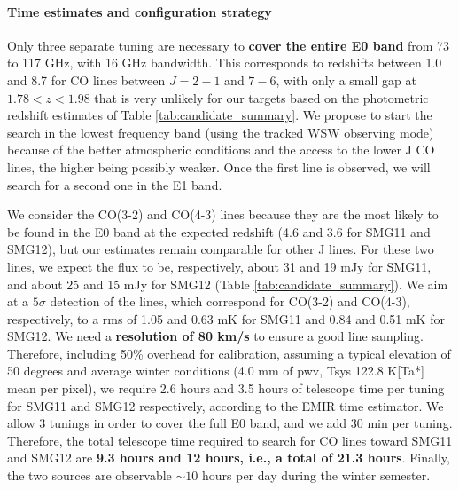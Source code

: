 \documentclass[11pt,a4paper,twoside,graphicx,color]{article}
\begin{document}
\paragraph{\large Time estimates and configuration strategy}
Only three separate tuning are necessary to {\bf cover the entire E0 band} from 73 to 117 GHz, with 16 GHz bandwidth. This corresponds to redshifts between 1.0 and 8.7 for CO lines between $J=2-1$ and $7-6$, with only a small gap at $1.78 < z < 1.98$ that is very unlikely for our targets based on the photometric redshift estimates of Table \ref{tab:candidate_summary}. We propose to start the search in the lowest frequency band (using the tracked WSW observing mode) because of the better atmospheric conditions and the access to the lower J CO lines, the higher being possibly weaker. Once the first line is observed, we will search for a second one in the E1 band.

We consider the CO(3-2) and CO(4-3) lines because they are the most likely to be found in the E0 band at the expected redshift (4.6 and 3.6 for SMG11 and SMG12), but our estimates remain comparable for other J lines. For these two lines, we expect the flux to be, respectively, about 31 and 19 mJy for SMG11, and about 25 and 15 mJy for SMG12 (Table \ref{tab:candidate_summary}). We aim at a $5 \sigma$ detection of the lines, which correspond for CO(3-2) and CO(4-3), respectively, to a rms of 1.05 and 0.63 mK for SMG11 and 0.84 and 0.51 mK for SMG12. We need a {\bf resolution of 80 km/s} to ensure a good line sampling. Therefore, including 50\% overhead for calibration, assuming a typical elevation of 50 degrees and average winter conditions (4.0 mm of pwv, Tsys 122.8 K[Ta*] mean per pixel), we require 2.6 hours and 3.5 hours of telescope time per tuning for SMG11 and SMG12 respectively, according to the EMIR time estimator. We allow 3 tunings in order to cover the full E0 band, and we add 30 min per tuning. Therefore, the total telescope time required to search for CO lines toward SMG11 and SMG12 are {\bf 9.3 hours and 12 hours, i.e., a total of 21.3 hours}. Finally, the two sources are observable $\sim 10$ hours per day during the winter semester.

\newpage
\end{document}
